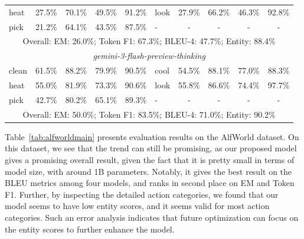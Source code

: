 \begin{table}[h]
\begin{tabular}{lcccc|lcccc}
heat             &    27.5\%   &   70.1\%  &  49.5\%&      91.2\%&
look             &    27.9\%   &   66.2\%  &  46.3\%&      92.8\%\\
pick            &    21.2\%   &   64.1\%  &  43.5\%&      87.5\%&
- & - & - & - & -\\
\midrule
\multicolumn{10}{c}{Overall: EM: 26.0\%; Token F1: 67.3\%; BLEU-4: 47.7\%; Entity: 88.4\%}\\
\midrule
\multicolumn{10}{c}{\textit{gemini-3-flash-preview-thinking \citep{gemini3flash2025}}}\\
\midrule
clean            &    61.5\% &     88.2\%  &  79.9\%&      90.5\%&
cool             &    54.5\% &     88.1\%  &  77.0\%&      88.3\%\\
heat             &    55.0\% &     81.9\%  &  73.3\%&      90.6\%&
look             &    55.8\% &     86.6\%  &  74.4\%&      97.7\%\\
pick            &    42.7\%  &    80.2\%   & 65.1\% &     89.3\%&
- & - & - & - & -\\
\midrule
\multicolumn{10}{c}{Overall: EM: 50.0\%; Token F1: 83.5\%; BLEU-4: 71.0\%; Entity: 90.2\%}\\
\bottomrule
\end{tabular}
\end{table}

Table~\ref{tab:alfworldmain} presents evaluation results on the AlfWorld dataset. On this dataset, we see that the trend can still be promising, as our proposed model gives a promising overall result, given the fact that it is pretty small in terms of model size, with around 1B parameters. Notably, it gives the best result on the BLEU metrics \citep{papineni-etal-2002-bleu} among four models, and ranks in second place on EM and Token F1. Further, by inspecting the detailed action categories, we found that our model seems to have low entity scores, and it seems valid for most action categories. Such an error analysis indicates that future optimization can focus on the entity scores to further enhance the model.
